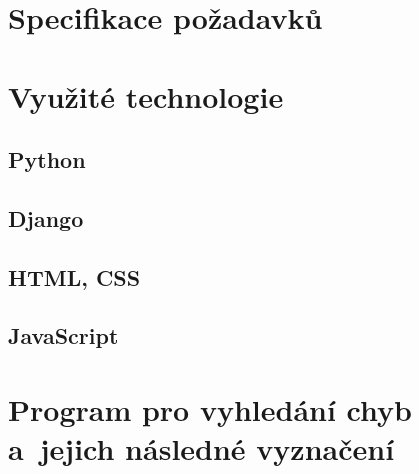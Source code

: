 \dummyText


\section{Specifikace požadavků}

\dummyText

\dummyText


\section{Využité technologie}

\dummyShortText[9]


\subsection*{Python}

\dummyText[2]


\subsection*{Django}

\dummyShortText[13]

\dummyText


\subsection*{HTML, CSS}

\dummyText


\subsection*{JavaScript}

\dummyText


\section{Program pro vyhledání chyb a~jejich následné vyznačení}

\DummyText

